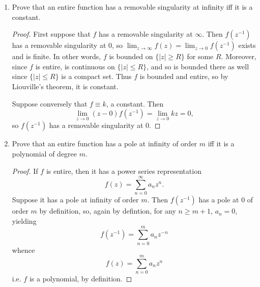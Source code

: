 \documentclass[11pt,oneside,english]{amsart}
\theoremstyle{definition}
\newcommand{\lom}[2]{\lim_{{#1}\rightarrow{#2}}}
\begin{document}
\begin{enumerate}
\begin{enumerate}
\itemsep5mm
\item Prove that an entire function has a removable singularity at infinity iff it is a constant.

\begin{proof}
First suppose that $f$ has a removable singularity at $\infty$. Then $f(z^{-1})$ has a removable singularity at 0, so $\lom{z}{\infty}f(z)=\lom{z}{0}f(z^{-1})$ exists and is finite. In other words, $f$ is bounded on $\{|z|\geq R\}$ for some $R$. Moreover, since $f$ is entire, is continuous on $\{|z|\leq R\}$, and so is bounded there as well since $\{|z|\leq R\}$ is a compact set. Thus $f$ is bounded and entire, so by Liouville's theorem, it is constant.

Suppose conversely that $f\equiv k$, a constant. Then
\[
\lom{z}{0}(z-0)f(z^{-1})=\lom{z}{0}kz=0,
\]
so $f(z^{-1})$ has a removable singularity at 0.
\end{proof}

\item Prove that an entire function has a pole at infinity of order $m$ iff it is a polynomial of degree $m$.

\begin{proof}
If $f$ is entire, then it has a power series representation
\[
f(z)=\sum_{n=0}^\infty a_nz^n.
\]
Suppose it has a pole at infinity of order $m$. Then $f(z^{-1})$ has a pole at 0 of order $m$ by definition, so, again by defintion, for any $n\geq m+1$, $a_n=0$, yielding
\[
f(z^{-1})=\sum_{n=0}^m a_nz^{-n}
\]
whence
\[
f(z)=\sum_{n=0}^ma_nz^n
\]
i.e. $f$ is a polynomial, by definition.
\end{proof}

\end{enumerate}



\end{enumerate}
\end{document}
